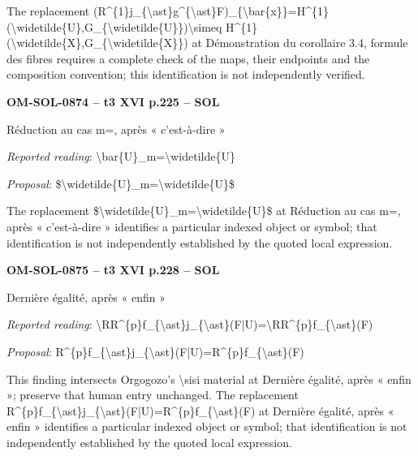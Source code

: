 The replacement (R\textasciicircum{}\{1\}j\_\{\textbackslash{}ast\}g\textasciicircum{}\{\textbackslash{}ast\}F)\_\{\textbackslash{}bar\{x\}\}=\allowbreak H\textasciicircum{}\{1\}(\textbackslash{}widetilde\{U\},G\_\{\textbackslash{}widetilde\{U\}\})\textbackslash{}simeq H\textasciicircum{}\{1\}(\textbackslash{}widetilde\{X\},G\_\{\textbackslash{}widetilde\{X\}\}) at Démonstration du corollaire 3.4, formule des fibres requires a complete check of the maps, their endpoints and the composition convention; this identification is not independently verified.\par
\par\noindent\textbf{OM-SOL-0874 -- t3 XVI p.225 -- SOL}\par
Réduction au cas m=, après « c'est-à-dire »\par
\emph{Reported reading}: \textbackslash{}bar\{U\}\_m=\allowbreak \textbackslash{}widetilde\{U\}\par
\emph{Proposal}: \$\textbackslash{}widetilde\{U\}\_m=\allowbreak \textbackslash{}widetilde\{U\}\$\par
The replacement \$\textbackslash{}widetilde\{U\}\_m=\allowbreak \textbackslash{}widetilde\{U\}\$ at Réduction au cas m=, après « c'est-à-dire » identifies a particular indexed object or symbol; that identification is not independently established by the quoted local expression.\par
\par\noindent\textbf{OM-SOL-0875 -- t3 XVI p.228 -- SOL}\par
Dernière égalité, après « enfin »\par
\emph{Reported reading}: \textbackslash{}RR\textasciicircum{}\{p\}f\_\{\textbackslash{}ast\}j\_\{\textbackslash{}ast\}(F|U)=\allowbreak \textbackslash{}RR\textasciicircum{}\{p\}f\_\{\textbackslash{}ast\}(F)\par
\emph{Proposal}: R\textasciicircum{}\{p\}f\_\{\textbackslash{}ast\}j\_\{\textbackslash{}ast\}(F|U)=\allowbreak R\textasciicircum{}\{p\}f\_\{\textbackslash{}ast\}(F)\par
This finding intersects Orgogozo's \textbackslash{}sisi material at Dernière égalité, après « enfin »; preserve that human entry unchanged. The replacement R\textasciicircum{}\{p\}f\_\{\textbackslash{}ast\}j\_\{\textbackslash{}ast\}(F|U)=\allowbreak R\textasciicircum{}\{p\}f\_\{\textbackslash{}ast\}(F) at Dernière égalité, après « enfin » identifies a particular indexed object or symbol; that identification is not independently established by the quoted local expression.\par
